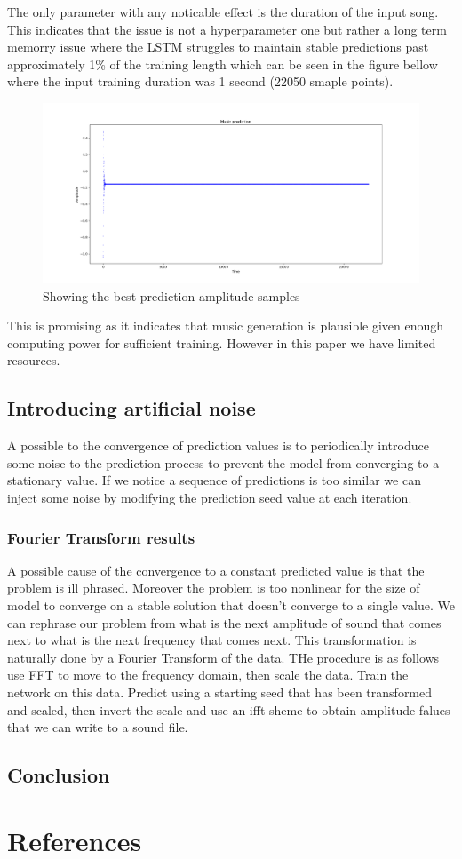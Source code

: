 \documentclass{article}
\begin{document}
The only parameter with any noticable effect is the duration of the input song. This indicates that the issue is not a hyperparameter one but rather a long term memorry issue where the LSTM struggles to maintain stable predictions past approximately 1\% of the training length which can be seen in the figure bellow where the input training duration was 1 second (22050 smaple points).  
\begin{figure}[H]
\caption{Showing the best prediction amplitude samples}
\includegraphics[scale=0.35]{better_convergence.png}
\end{figure}
This is promising as it indicates that music generation is plausible given enough computing power for sufficient training. However in this paper we have limited resources. 
\subsection{Introducing artificial noise}
A possible to the convergence of prediction values is to periodically introduce some noise to the prediction process to prevent the model from converging to a stationary value. If we notice a sequence of predictions is too similar we can inject some noise by modifying the prediction seed value at each iteration. 

\subsubsection{Fourier Transform results}
A possible cause of the convergence to a constant predicted value is that the problem is ill phrased. Moreover the problem is too nonlinear for the size of model to converge on a stable solution that doesn't converge to a single value. We can rephrase our problem from what is the next amplitude of sound that comes next to what is the next frequency that comes next. This transformation is naturally done by a Fourier Transform of the data. THe procedure is as follows use FFT to move to the frequency domain, then scale the data. Train the network on this data. Predict using a starting seed that has been transformed and scaled, then invert the scale and use an ifft sheme to obtain amplitude falues that we can write to a sound file. 

\subsection{Conclusion}
\label{sec:conclusion}

\section{References}
\printbibliography
\end{document}
